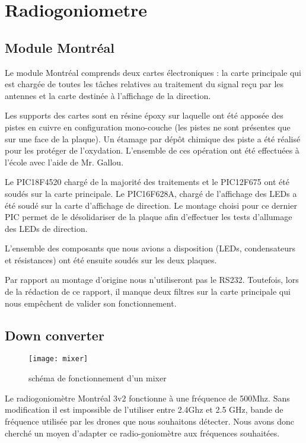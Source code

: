 
\chapter{Radiogoniometre}

 
\section{Module Montréal}

Le module Montréal comprends deux cartes électroniques : la carte principale qui est chargée de toutes les tâches relatives au traitement du signal reçu par les antennes et la carte destinée à l'affichage de la direction.

Les supports des cartes sont en résine époxy sur laquelle ont été apposée des pistes en cuivre en configuration mono-couche (les pistes ne sont présentes que sur une face de la plaque). Un étamage par dépôt chimique des piste a été réalisé pour les protéger de l'oxydation. L'ensemble de ces opération ont été effectuées à l'école avec l'aide de Mr. Gallou.
 
Le PIC18F4520 chargé de la majorité des traitements et le PIC12F675 ont été soudés sur la carte principale. Le PIC16F628A, chargé de l'affichage des LEDs a été soudé sur la carte d'affichage de direction. Le montage choisi pour ce dernier PIC permet de le désolidariser de la plaque afin d'effectuer les tests d'allumage des LEDs de direction.

L'ensemble des composants que nous avions a disposition (LEDs, condensateurs et résistances) ont été ensuite soudés sur les deux plaques. 

Par rapport au montage d'origine nous n'utiliseront pas le RS232. Toutefois, lors de la rédaction de ce rapport, il manque deux filtres sur la carte principale qui nous empêchent de valider son fonctionnement.


\section{Down converter}


\begin{wrapfigure}{r}{0.4\textwidth}
  
  \texttt{[image: mixer]}
  \caption{schéma de fonctionnement d'un mixer}
\end{wrapfigure}


Le radiogoniomètre Montréal 3v2 fonctionne à une fréquence de 500Mhz. Sans modification il est impossible de l’utiliser entre 2.4Ghz et 2.5 GHz, bande de fréquence utilisée par les drones que nous souhaitons détecter. Nous avons donc cherché un moyen d’adapter ce radio-goniomètre aux fréquences souhaitées.

